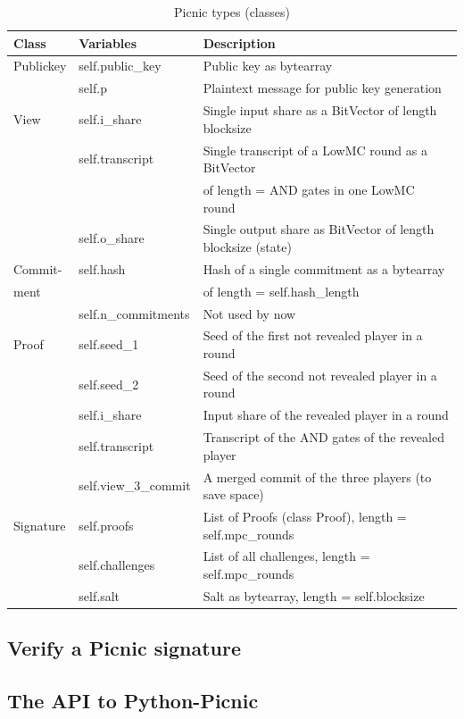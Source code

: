 \documentclass[]{article}
\begin{document}
\begin{table}[htbp]
\begin{center}
\begin{tabular}{|l|l|l|}
\hline
\textbf{Class}  & \textbf{Variables} & \textbf{Description} \\ \hline
Publickey & self.public\_key & Public key as bytearray \\
		  & self.p			  & Plaintext message for public key generation \\ \hline
View	  & self.i\_share     & Single input share as a BitVector of length blocksize \\ 
		  & self.transcript  & Single transcript of a LowMC round as a BitVector\\
		  &					  & of length = AND gates in one LowMC round\\
		  & self.o\_share     & Single output share as BitVector of length blocksize (state)\\ \hline
Commit-   & self.hash       & Hash of a single commitment as a bytearray\\
ment      &                 & of length = self.hash\_length \\
		  & self.n\_commitments & Not used by now \\ \hline
Proof     & self.seed\_1  & Seed of the first not revealed player in a round\\
		  & self.seed\_2  & Seed of the second not revealed player in a round\\
		  & self.i\_share & Input share of the revealed player in a round\\
		  & self.transcript & Transcript of the AND gates of the revealed player\\
		  & self.view\_3\_commit & A merged commit of the three players (to save space)\\ \hline
Signature & self.proofs & List of Proofs (class Proof), length = self.mpc\_rounds\\
		  & self.challenges & List of all challenges, length = self.mpc\_rounds\\
		  & self.salt & Salt as bytearray, length = self.blocksize\\ \hline
\end{tabular}
\caption{Picnic types (classes)}
\label{tab:types}
\end{center}
\end{table}

\subsection{Verify a Picnic signature}
\subsection{The API to Python-Picnic}
%
%
\end{document}
